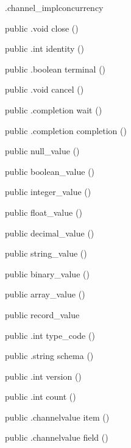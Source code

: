 \begin{CrexxClass}{.channel\_impl}{concurrency}
\begin{Members}
    \Method
      {public}
      {.void}
      {close}
      {()}

    \Method
      {public}
      {.int}
      {identity}
      {()}

    \Method
      {public}
      {.boolean}
      {terminal}
      {()}

    \Method
      {public}
      {.void}
      {cancel}
      {()}

    \Method
      {public}
      {.completion}
      {wait}
      {()}

    \Method
      {public}
      {.completion}
      {completion}
      {()}

    \Factory
      {public}
      {null\_value}
      {()}

    \Factory
      {public}
      {boolean\_value}
      {()}

    \Factory
      {public}
      {integer\_value}
      {()}

    \Factory
      {public}
      {float\_value}
      {()}

    \Factory
      {public}
      {decimal\_value}
      {()}

    \Factory
      {public}
      {string\_value}
      {()}

    \Factory
      {public}
      {binary\_value}
      {()}

    \Factory
      {public}
      {array\_value}
      {()}

    \Factory
      {public}
      {record\_value}
      {}

    \Method
      {public}
      {.int}
      {type\_code}
      {()}

    \Method
      {public}
      {.string}
      {schema}
      {()}

    \Method
      {public}
      {.int}
      {version}
      {()}

    \Method
      {public}
      {.int}
      {count}
      {()}

    \Method
      {public}
      {.channelvalue}
      {item}
      {()}

    \Method
      {public}
      {.channelvalue}
      {field}
      {()}


\end{Members}
\end{CrexxClass}
